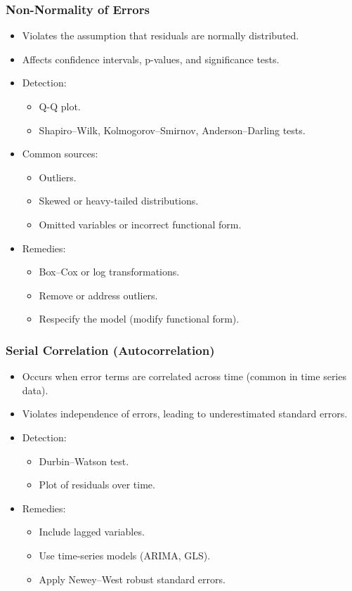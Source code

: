 \documentclass[10pt,a4paper]{article}
\begin{document}
	\subsubsection{Non-Normality of Errors}

	\begin{itemize}
		\item Violates the assumption that residuals are normally distributed.
		\item Affects confidence intervals, p-values, and significance tests.
		\item Detection:
		\begin{itemize}
			\item Q-Q plot.
			\item Shapiro–Wilk, Kolmogorov–Smirnov, Anderson–Darling tests.
		\end{itemize}
		\item Common sources:
		\begin{itemize}
			\item Outliers.
			\item Skewed or heavy-tailed distributions.
			\item Omitted variables or incorrect functional form.
		\end{itemize}
		\item Remedies:
		\begin{itemize}
			\item Box–Cox or log transformations.
			\item Remove or address outliers.
			\item Respecify the model (modify functional form).
		\end{itemize}
	\end{itemize}

	\subsubsection{Serial Correlation (Autocorrelation)}

	\begin{itemize}
		\item Occurs when error terms are correlated across time (common in time series data).
		\item Violates independence of errors, leading to underestimated standard errors.
		\item Detection:
		\begin{itemize}
			\item Durbin–Watson test.
			\item Plot of residuals over time.
		\end{itemize}
		\item Remedies:
		\begin{itemize}
			\item Include lagged variables.
			\item Use time-series models (ARIMA, GLS).
			\item Apply Newey–West robust standard errors.
		\end{itemize}
	\end{itemize}
\end{document}

